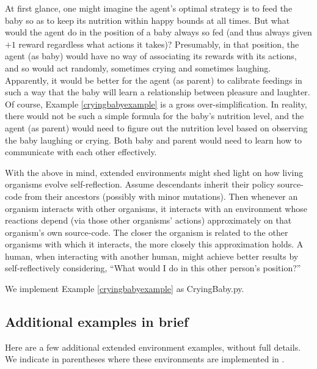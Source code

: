 \documentclass{article}
\begin{document}
At first glance, one might imagine the agent's optimal strategy is to feed the baby
so as to keep its nutrition within happy bounds at all times. But what would the
agent do in the position of a baby always so fed (and thus always given $+1$ reward
regardless what actions it takes)? Presumably, in that position, the agent (as baby) would have
no way of associating its rewards with its actions, and so would act randomly,
sometimes crying and sometimes laughing. Apparently, it would be better for the agent
(as parent) to calibrate feedings in such a way that the baby will learn a relationship
between pleasure and laughter. Of course, Example \ref{cryingbabyexample} is a gross
over-simplification. In reality, there would not be such a simple formula for the
baby's nutrition level, and the agent (as parent) would need to figure out the nutrition level
based on observing the baby laughing or crying. Both baby and parent would need to
learn how to communicate with each other effectively.

With the above in mind, extended environments might shed light on how living organisms
evolve self-reflection. Assume descendants inherit their policy source-code from their ancestors
(possibly with minor mutations). Then whenever an organism interacts with other organisms,
it interacts with an environment whose reactions depend (via those other organisms' actions)
approximately on that organism's own source-code. The closer the organism is related
to the other organisms with which it interacts, the more closely this approximation holds.
A human, when interacting with another human, might achieve better results by self-reflectively
considering, ``What would I do in this other person's position?''

We implement Example \ref{cryingbabyexample} as CryingBaby.py.

\subsection{Additional examples in brief}

Here are a few additional extended environment examples, without full details.
We indicate in parentheses where these environments are implemented in \cite{library}.
\end{document}
